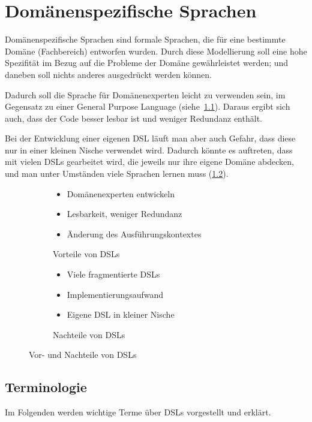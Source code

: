 \documentclass[../InterneDSLs.tex]{subfiles}
\begin{document}
\chapter{Domänenspezifische Sprachen}\label{SEC:DomainSpecificLanguages}
Domänenspezifische Sprachen sind formale Sprachen, die für eine bestimmte Domäne (Fachbereich) entworfen wurden. Durch diese Modellierung soll eine hohe Spezifität im Bezug auf die Probleme der Domäne gewährleistet werden; und daneben soll nichts anderes ausgedrückt werden können.

Dadurch soll die Sprache für Domänenexperten leicht zu verwenden sein, im Gegensatz zu einer General Purpose Language (siehe~\ref{FIG:DslAdvantages}). Daraus ergibt sich auch, dass der Code besser lesbar ist und weniger Redundanz enthält.

Bei der Entwicklung einer eigenen DSL läuft man aber auch Gefahr, dass diese nur in einer kleinen Nische verwendet wird. Dadurch könnte es auftreten, dass mit vielen DSLs gearbeitet wird, die jeweils nur ihre eigene Domäne abdecken, und man unter Umständen viele Sprachen lernen muss (\ref{FIG:DslDisadvantages}).

\begin{figure}[ht]
\centering
  \begin{subfigure}[c]{0.49\textwidth}
    \begin{itemize}
	  \item Domänenexperten entwickeln
	  \item Lesbarkeit, weniger Redundanz
	  \item Änderung des Ausführungskontextes
    \end{itemize}
    \caption{Vorteile von DSLs}
    \label{FIG:DslAdvantages}
  \end{subfigure}
  \begin{subfigure}[c]{0.49\textwidth}
    \begin{itemize}
	  \item Viele fragmentierte DSLs
	  \item Implementierungsaufwand
	  \item Eigene DSL in kleiner Nische
    \end{itemize}
    \caption{Nachteile von DSLs}
    \label{FIG:DslDisadvantages}
  \end{subfigure}
  \caption{Vor- und Nachteile von DSLs}
  \label{FIG:DslAdvantagesDisadvantages}
\end{figure}


\section{Terminologie}
Im Folgenden werden wichtige Terme über DSLs vorgestellt und erklärt.
\end{document}
